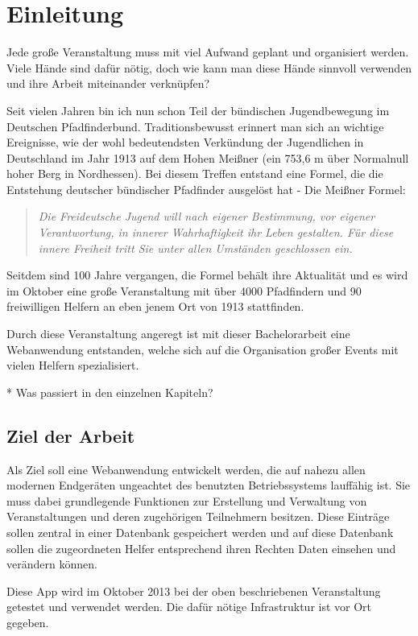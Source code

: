 \chapter{Einleitung}
Jede große Veranstaltung muss mit viel Aufwand geplant und organisiert werden. Viele Hände sind dafür nötig, doch wie kann man diese Hände sinnvoll verwenden und ihre Arbeit miteinander verknüpfen?\par

Seit vielen Jahren bin ich nun schon Teil der bündischen Jugendbewegung im Deutschen Pfadfinderbund. Traditionsbewusst erinnert man sich an wichtige Ereignisse, wie der wohl bedeutendsten Verkündung der Jugendlichen in Deutschland im Jahr 1913 auf dem Hohen Meißner (ein 753,6 m über Normalnull hoher Berg in Nordhessen). Bei diesem Treffen entstand eine Formel, die die Entstehung deutscher bündischer Pfadfinder ausgelöst hat - Die Meißner Formel:
\begin{quote}
	\textit{\glqq Die Freideutsche Jugend will nach eigener Bestimmung, vor eigener Verantwortung, in innerer Wahrhaftigkeit ihr Leben gestalten. Für diese innere Freiheit tritt Sie unter allen Umständen geschlossen ein.\grqq{}}\cite[S. 109]{meissnerformel}
\end{quote}
Seitdem sind 100 Jahre vergangen, die Formel behält ihre Aktualität und es wird im Oktober eine große Veranstaltung mit über 4000 Pfadfindern und 90 freiwilligen Helfern an eben jenem Ort von 1913 stattfinden.\par

Durch diese Veranstaltung angeregt ist mit dieser Bachelorarbeit eine Webanwendung entstanden, welche sich auf die Organisation großer Events mit vielen Helfern spezialisiert.

* Was passiert in den einzelnen Kapiteln?

\section{Ziel der Arbeit}
Als Ziel soll eine Webanwendung entwickelt werden, die auf nahezu allen modernen Endgeräten ungeachtet des benutzten Betriebssystems lauffähig ist. Sie muss dabei grundlegende Funktionen zur Erstellung und Verwaltung von Veranstaltungen und deren zugehörigen Teilnehmern besitzen. Diese Einträge sollen zentral in einer Datenbank gespeichert werden und auf diese Datenbank sollen die zugeordneten Helfer entsprechend ihren Rechten Daten einsehen und verändern können.\par
Diese App wird im Oktober 2013 bei der oben beschriebenen Veranstaltung getestet und verwendet werden. Die dafür nötige Infrastruktur ist vor Ort gegeben.
